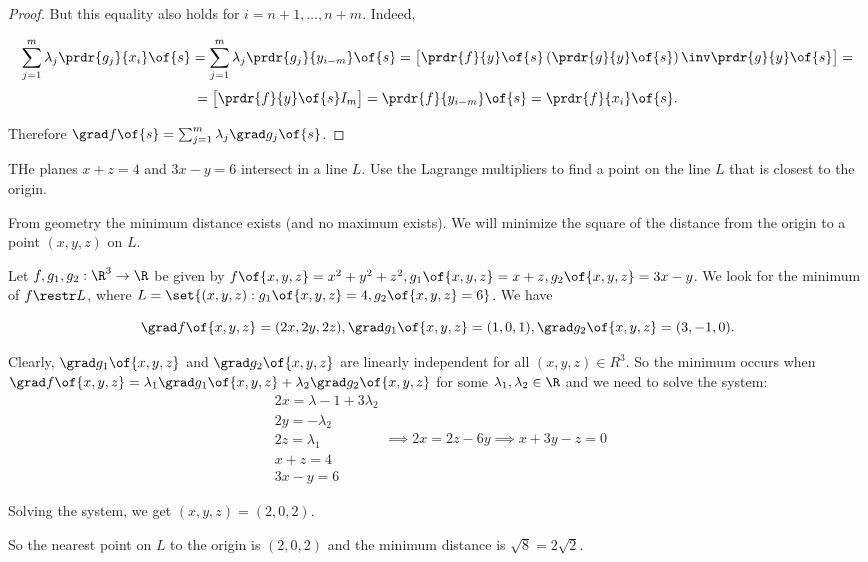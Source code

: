 \begin{proof}
    But this equality also holds for $i = n+1, \dots, n + m$. Indeed,

    \[\sum_{j=1}^{m} \lambda_j \prdr{g_j}{x_i}\of{s} = \sum_{j=1}^{m} \lambda_j \prdr{g_j}{y_{i-m}}\of{s} = \begin{bmatrix} \prdr{f}{y}\of{s} \left(\prdr{g}{y}\of{s}\right)\inv \prdr{g}{y}\of{s} \end{bmatrix} =\]
    \[= \begin{bmatrix} \prdr{f}{y}\of{s} I_m \end{bmatrix} = \prdr{f}{y_{i-m}}\of{s} = \prdr{f}{x_i}\of{s}.\]

    Therefore $\grad f\of{s} = \sum_{j=1}^{m} \lambda_j \grad g_j\of{s}$.
\end{proof}

\begin{example}
    THe planes $x + z = 4$ and $3x - y = 6$ intersect in a line $L$. Use the Lagrange multipliers to find a point on the line $L$ that is closest to the origin.

    From geometry the minimum distance exists (and no maximum exists). We will minimize the square of the distance from the origin to a point $(x,y,z)$ on $L$.

    Let $f, g_1, g_2: \R^3 \to \R$ be given by $f\of{x,y,z} = x^2 + y^2 + z^2, g_1\of{x,y,z} = x + z, g_2\of{x,y,z} = 3x - y$. We look for the minimum of $f \restr L$, where $L = \set{(x,y,z): g_1\of{x,y,z} = 4, g_2\of{x,y,z} = 6}$. We have

    \[\grad f\of{x,y,z} = (2x, 2y, 2z), \grad g_1\of{x,y,z} = (1,0,1), \grad g_2\of{x,y,z} = (3,-1,0).\]

    Clearly, $\grad g_1\of{x,y,z}$ and $\grad g_2\of{x,y,z}$ are linearly independent for all $(x,y,z) \in R^3$. So the minimum occurs when $\grad f\of{x,y,z} = \lambda_1 \grad g_1\of{x,y,z} + \lambda_2 \grad g_2\of{x,y,z}$ for some $\lambda_1, \lambda_2 \in \R$ and we need to solve the system:
    \[ \begin{matrix}
        2x = \lambda-1 + 3\lambda_2
        \\ 2y = -\lambda_2
        \\ 2z =  \lambda_1
        \\ x + z = 4
        \\ 3x - y = 6
    \end{matrix} \implies 2x = 2z - 6y \implies x + 3y - z = 0\]

    Solving the system, we get $(x,y,z) = (2,0,2)$.

    So the nearest point on $L$ to the origin is $(2,0,2)$ and the minimum distance is $\sqrt{8} = 2\sqrt{2}$.
\end{example}

